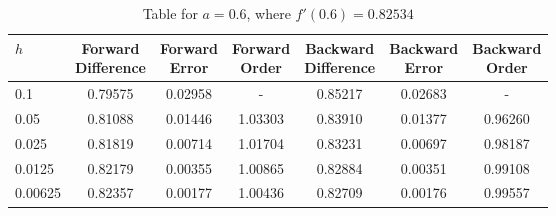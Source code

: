 \begin{table}
\centering
\caption{Table for $a = 0.6$, where $f'(0.6) = 0.82534$}
\begin{tabular}{lcccccc}
\toprule
    $h$ & \makecell{Forward \\ Difference} & \makecell{Forward \\ Error} & \makecell{Forward \\ Order} & \makecell{Backward \\ Difference} & \makecell{Backward \\ Error} & \makecell{Backward \\ Order} \\
\midrule
    0.1 &                          0.79575 &                     0.02958 &                           - &                           0.85217 &                      0.02683 &                            - \\
   0.05 &                          0.81088 &                     0.01446 &                     1.03303 &                           0.83910 &                      0.01377 &                      0.96260 \\
  0.025 &                          0.81819 &                     0.00714 &                     1.01704 &                           0.83231 &                      0.00697 &                      0.98187 \\
 0.0125 &                          0.82179 &                     0.00355 &                     1.00865 &                           0.82884 &                      0.00351 &                      0.99108 \\
0.00625 &                          0.82357 &                     0.00177 &                     1.00436 &                           0.82709 &                      0.00176 &                      0.99557 \\
\bottomrule
\end{tabular}
\end{table}
